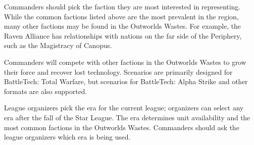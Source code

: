 Commanders should pick the faction they are most interested in representing.
While the common factions listed above are the most prevalent in the region, many other factions may be found in the Outworlds Wastes.
For example, the Raven Alliance has relationships with nations on the far side of the Periphery, such as the Magistracy of Canopus.

Commanders will compete with other factions in the Outworlds Wastes to grow their force and recover lost technology.
Scenarios are primarily designed for BattleTech: Total Warfare, but scenarios for BattleTech: Alpha Strike and other formats are also supported.

League organizers pick the era for the current league; organizers can select any era after the fall of the Star League.
The era determines unit availability and the most common factions in the Outworlds Wastes.
Commanders should ask the league organizers which era is being used.
